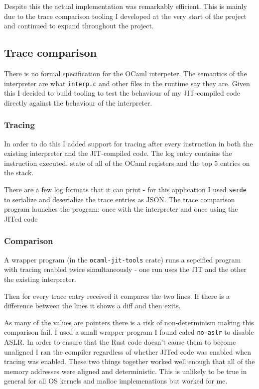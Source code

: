 Despite this the actual implementation was remarkably efficient. This is mainly due to the trace
comparison tooling I developed at the very start of the project and continued to expand throughout
the project.

\subsection{Trace comparison} \label{tracing}

There is no formal specification for the OCaml interpeter. The semantics of the interpreter are
what
\texttt{interp.c} and other files in the runtime say they are. Given this I decided to build
tooling to test the behaviour of my JIT-compiled code directly against the behaviour of the
interpreter.

\subsubsection{Tracing}

In order to do this I added support for tracing after every instruction in both the existing
interpreter and the JIT-compiled code. The log entry contains the instruction executed, state of
all of the OCaml registers and the top 5 entries on the stack.

There are a few log formats that it can print - for this application I used \texttt{serde} to
serialize and deserialize the trace entries as JSON. The trace comparison program launches the
program: once with the interpreter and once using the JITed code

\subsubsection{Comparison}

A wrapper program (in the \texttt{ocaml-jit-tools} crate) runs a sepcified program with
tracing enabled twice simultaneously - one run uses the JIT and the other the
existing interpreter.

Then for every trace entry received it compares the two lines. If there is a difference between the
lines
it shows a diff and then exits.

As many of the values are pointers there is a risk of non-determinism making this comparison fail.
I used a small wrapper program I found caled \texttt{no-aslr} to disable ASLR. In order to ensure
that the Rust code doesn't cause them to become unaligned I ran the compiler regardless of whether
JITed code was enabled when tracing was enabled. These two things together worked well enough that
all of the memory addresses were aligned and deterministic. This is unlikely to be true in general
for all OS kernels and malloc implemenations but worked for me.

